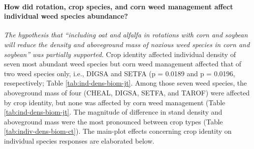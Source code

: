 \documentclass[
]{article}
\begin{document}
\hypertarget{how-did-rotation-crop-species-and-corn-weed-management-affect-individual-weed-species-abundance}{%
\paragraph*{How did rotation, crop species, and corn weed management affect individual weed species abundance?}\label{how-did-rotation-crop-species-and-corn-weed-management-affect-individual-weed-species-abundance}}

\emph{The hypothesis that ``including oat and alfalfa in rotations with corn and soybean will reduce the density and aboveground mass of noxious weed species in corn and soybean'' was partially supported.} Crop identity affected individual density of seven most abundant weed species but corn weed management affected that of two weed species only, i.e., DIGSA and SETFA (p = 0.0189 and p = 0.0196, resepectively; Table \ref{tab:ind-dens-biom-jt}. Among those seven weed species, the aboveground mass of four (CHEAL, DIGSA, SETFA, and TAROF) were affected by crop identity, but none was affected by corn weed management (Table \ref{tab:ind-dens-biom-jt}. The magnitude of difference in stand density and aboveground mass were the most pronounced between crop types (Table \ref{tab:indiv-dens-biom-ct}). The main-plot effects concerning crop identity on individual species responses are elaborated below.
\end{document}
